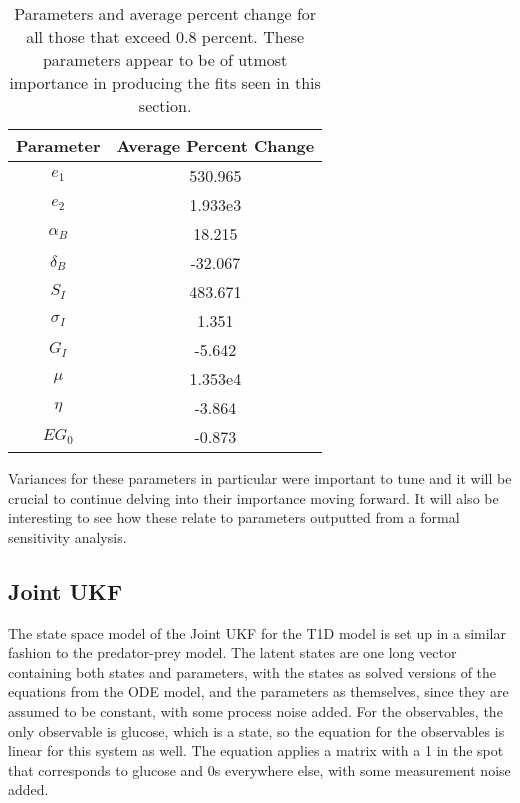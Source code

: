\begin{table}[H]
  \begin{center}
    \label{tab:table1}
    \begin{tabular}{c|c} %
      \textbf{Parameter} & \textbf{Average Percent Change} \\
      \hline
      \textbf{$e_1$} & 530.965\\
      \textbf{$e_2$} & 1.933e3\\
      \textbf{$\alpha_B$} & 18.215\\
      \textbf{$\delta_B$} & -32.067\\
      \textbf{$S_I$} & 483.671\\
      \textbf{$\sigma_I$} & 1.351\\
      \textbf{$G_I$} & -5.642\\
      \textbf{$\mu$} & 1.353e4\\
      \textbf{$\eta$} & -3.864\\
      \textbf{$EG_0$} & -0.873
    \end{tabular}
    \caption{Parameters and average percent change for all those that exceed 0.8 percent. These parameters appear to be of utmost importance in producing the fits seen in this section.}
  \end{center}
\end{table}

Variances for these parameters in particular were important to tune and it will be crucial to continue delving into their importance moving forward. It will also be interesting to see how these relate to parameters outputted from a formal sensitivity analysis.



\subsection{Joint UKF}

The state space model of the Joint UKF for the T1D model is set up in a similar fashion to the predator-prey model. The latent states are one long vector containing both states and parameters, with the states as solved versions of the equations from the ODE model, and the parameters as themselves, since they are assumed to be constant, with some process noise added. For the observables, the only observable is glucose, which is a state, so the equation for the observables is linear for this system as well. The equation applies a matrix with a 1 in the spot that corresponds to glucose and 0s everywhere else, with some measurement noise added. 

